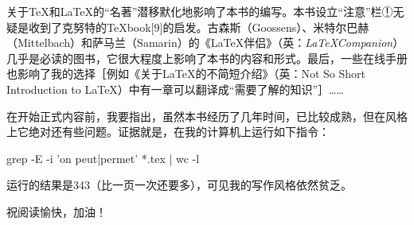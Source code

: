 关于\TeX 和\LaTeX 的“名著”潜移默化地影响了本书的编写。本书设立“注意”栏{\textcircled{\scriptsize ！}}无疑是收到了克努特的\TeX book[9]的启发。古森斯（Goossens）、米特尔巴赫（Mittelbach）和萨马兰（Samarin）的《\LaTeX 伴侣》（英：\textit{\LaTeX Companion}）几乎是必读的图书，它很大程度上影响了本书的内容和形式。最后，一些在线手册也影响了我的选择［例如《关于\LaTeX 的不简短介绍》（英：Not So Short Introduction to \LaTeX）中有一章可以翻译成“需要了解的知识”］……

在开始正式内容前，我要指出，虽然本书经历了几年时间，已比较成熟，但在风格上它绝对还有些问题。证据就是，在我的计算机上运行如下指令：

\begin{dmd}
grep -E -i 'on peut|permet' *.tex | wc -l
\end{dmd}

运行的结果是343（比一页一次还要多），可见我的写作风格依然贫乏。

 \hfill 祝阅读愉快，加油！
